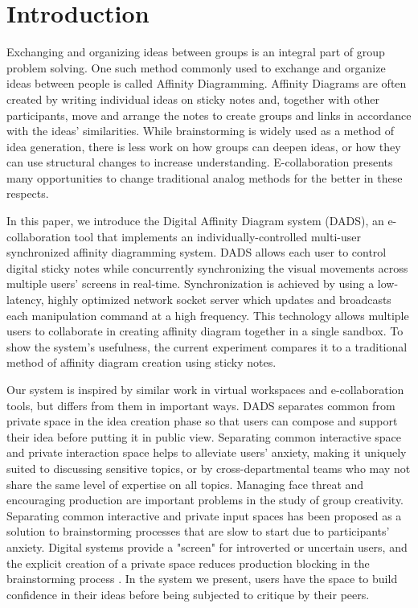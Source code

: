 \documentclass{sigchi}
\begin{document}



\section{Introduction}
Exchanging and organizing ideas between groups is an integral part of group problem solving. One such method commonly used to exchange and organize ideas between people is called Affinity Diagramming\cite{kawakita1991original}. Affinity Diagrams are often created by writing individual ideas on sticky notes and, together with other participants, move and arrange the notes to create groups and links in accordance with the ideas' similarities. While brainstorming is widely used as a method of idea generation, there is less work on how groups can deepen ideas, or how they can use structural changes to increase understanding.\cite{dickey2012framespaces} E-collaboration presents many opportunities to change traditional analog methods for the better in these respects.

In this paper, we introduce the Digital Affinity Diagram system (DADS), an e-collaboration tool that implements an individually-controlled multi-user synchronized affinity diagramming system. DADS allows each user to control digital sticky notes while concurrently synchronizing the visual movements across multiple users' screens in real-time. Synchronization is achieved by using a low-latency, highly optimized network socket server which updates and broadcasts each manipulation command at a high frequency. This technology allows multiple users to collaborate in creating affinity diagram together in a single sandbox. To show the system's usefulness, the current experiment compares it to a traditional method of affinity diagram creation using sticky notes. 

Our system is inspired by similar work in virtual workspaces and e-collaboration tools, but differs from them in important ways. DADS separates common from private space in the idea creation phase so that users can compose and support their idea before putting it in public view. Separating common interactive space and private interaction space helps to alleviate users' anxiety, making it uniquely suited to discussing sensitive topics, or by cross-departmental teams who may not share the same level of expertise on all topics. Managing face threat and encouraging production are important problems in the study of group creativity. Separating common interactive and private input spaces has been proposed as a solution to brainstorming processes that are slow to start due to participants' anxiety\cite{paulus2000idea}. Digital systems provide a "screen" for introverted or uncertain users, and the explicit creation of a private space reduces production blocking in the brainstorming process \cite{brown1996simple}. In the system we present, users have the space to build confidence in their ideas before being subjected to critique by their peers.
\end{document}
